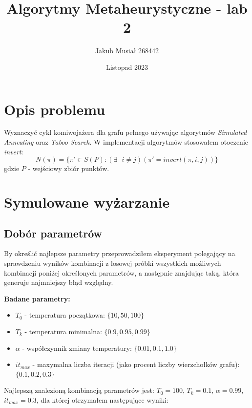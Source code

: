 \documentclass[12pt]{article}
\title{Algorytmy Metaheurystyczne - lab 2}
\author{Jakub Musiał 268442}
\date{Listopad 2023}
\begin{document}
\maketitle

\vspace*{2cm}

\section{Opis problemu}
Wyznaczyć cykl komiwojażera dla grafu pełnego używając algorytmów \textit{Simulated Annealing} oraz
\textit{Taboo Search}.
\noindent\newline
W implementacji algorytmów stosowałem otoczenie \textit{invert}:
$$N(\pi) = \{\pi' \in S(P) : (\exists \text{ } i \ne j)(\pi' = invert(\pi, i, j))\}$$
gdzie $P$ - wejściowy zbiór punktów.

\section{Symulowane wyżarzanie}
    \subsection{Dobór parametrów}
        By określić najlepsze parametry przeprowadziłem eksperyment polegający na sprawdzeniu wyników
        kombinacji z losowej próbki wszystkich możliwych kombinacji poniżej określonych parametrów,
        a następnie znajdując taką, która generuje najmniejszy błąd względny.
        \newline

        \noindent \textbf{Badane parametry:}
        \begin{itemize}
            \item $T_0$ - temperatura początkowa: $\{10, 50, 100\}$
            \item $T_k$ - temperatura minimalna: $\{0.9, 0.95, 0.99\}$
            \item $\alpha$ - współczynnik zmiany temperatury: $\{0.01, 0.1, 1.0\}$
            \item $it_{max}$ - maxymalna liczba iteracji (jako procent liczby wierzchołków grafu): $\{0.1, 0.2, 0.3\}$
        \end{itemize}

        \noindent Najlepszą znalezioną kombinacją parametrów jest:
        $T_0 = 100$, $T_k = 0.1$, $\alpha = 0.99$, $it_{max} = 0.3$,
        dla której otrzymałem następujące wyniki:
\end{document}
